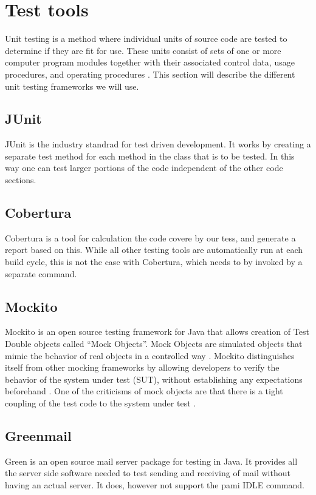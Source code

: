 \section{Test tools}
Unit testing is a method where individual units of source code are tested to determine if they are fit for use. These units consist of sets of one or more computer program modules together with their associated control data, usage procedures, and operating procedures \cite{bib:kolawa}. This section will describe the different unit testing frameworks we will use.

\subsection{JUnit}
JUnit is the industry standrad for test driven development. It works by creating a separate test method for each method in the class that is to be tested. In this way one can test larger portions of the code independent of the other code sections. \cite{bib:junit}

\subsection{Cobertura}
Cobertura is a tool for calculation the code covere by our tess, and generate a report based on this. While all other testing tools are automatically run at each build cycle, this is not the case with Cobertura, which needs to by invoked by a separate command.\cite{bib:cobertura}

\subsection{Mockito}
Mockito is an open source testing framework for Java that allows creation of Test Double objects called “Mock Objects”. Mock Objects are simulated objects that mimic the behavior of real objects in a controlled way \cite{bib:mock}.
\newline
\newline
Mockito distinguishes itself from other mocking frameworks by allowing developers to verify the behavior of the system under test (SUT), without establishing any expectations beforehand \cite{bib:mockito}.
One of the criticisms of mock objects are that there is a tight coupling of the test code to the system under test \cite{bib:mocks}.

\subsection{Greenmail}
Green is an open source mail server package for testing in Java. It provides all the server side software needed to test sending and receiving of mail without having an actual server. It does, however not support the \gls{pami} IDLE command.\cite{bib:greenmail}



